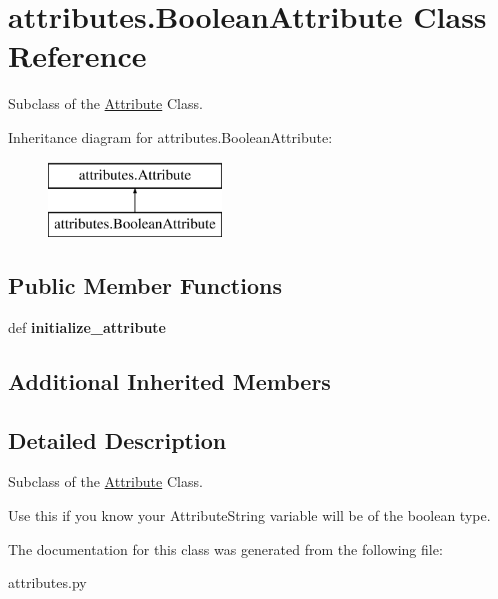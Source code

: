 \hypertarget{classattributes_1_1_boolean_attribute}{\section{attributes.\-Boolean\-Attribute Class Reference}
\label{classattributes_1_1_boolean_attribute}
}


Subclass of the \hyperlink{classattributes_1_1_attribute}{Attribute} Class.  


Inheritance diagram for attributes.\-Boolean\-Attribute\-:\begin{figure}[H]
\begin{center}
\leavevmode
\includegraphics[height=2.000000cm]{classattributes_1_1_boolean_attribute}
\end{center}
\end{figure}
\subsection*{Public Member Functions}
\begin{DoxyCompactItemize}
\item 
\hypertarget{classattributes_1_1_boolean_attribute_a567a76969c4b7c4b14e36bd76b9ecb5b}{def {\bfseries initialize\-\_\-attribute}}\label{classattributes_1_1_boolean_attribute_a567a76969c4b7c4b14e36bd76b9ecb5b}

\end{DoxyCompactItemize}
\subsection*{Additional Inherited Members}


\subsection{Detailed Description}
Subclass of the \hyperlink{classattributes_1_1_attribute}{Attribute} Class. 

Use this if you know your Attribute\-String variable will be of the boolean type. 

The documentation for this class was generated from the following file\-:\begin{DoxyCompactItemize}
\item 
attributes.\-py\end{DoxyCompactItemize}
